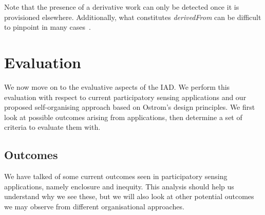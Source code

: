Note that the presence of a derivative work can only be detected once it is provisioned elsewhere. Additionally, what constitutes \emph{derivedFrom} can be difficult to pinpoint in many cases~\citep{Lessig2004}.



\section{Evaluation}

We now move on to the evaluative aspects of the \ac{IAD}. We perform this evaluation with respect to current participatory sensing applications and our proposed self-organising approach based on Ostrom's design principles. We first look at possible outcomes arising from applications, then determine a set of criteria to evaluate them with.

\subsection{Outcomes}

We have talked of some current outcomes seen in participatory sensing applications, namely enclosure and inequity. 
This analysis should help us understand why we see these, but we will also look at other potential outcomes we may observe from different organisational approaches. 

